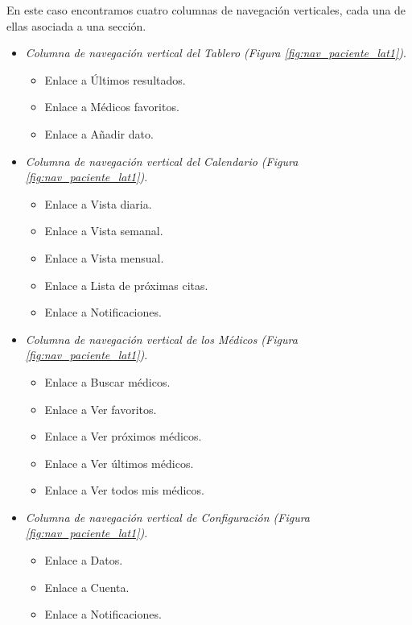 		
		En este caso encontramos cuatro columnas de navegación verticales, cada una de ellas asociada a una sección.
		\begin{itemize}
			\item \textit{Columna de navegación vertical del Tablero (Figura \ref{fig:nav_paciente_lat1})}. 
				\begin{itemize}
					\item Enlace a Últimos resultados.
					\item Enlace a Médicos favoritos.
					\item Enlace a Añadir dato.
				\end{itemize}
			\item \textit{Columna de navegación vertical del Calendario (Figura \ref{fig:nav_paciente_lat1})}.
				\begin{itemize}
					\item Enlace a Vista diaria.
					\item Enlace a Vista semanal.
					\item Enlace a Vista mensual.
					\item Enlace a Lista de próximas citas.
					\item Enlace a Notificaciones.
				\end{itemize}
			\item \textit{Columna de navegación vertical de los Médicos (Figura \ref{fig:nav_paciente_lat1})}.
				\begin{itemize}
					\item Enlace a Buscar médicos.
					\item Enlace a Ver favoritos.
					\item Enlace a Ver próximos médicos.
					\item Enlace a Ver últimos médicos.
					\item Enlace a Ver todos mis médicos.
				\end{itemize}
			\item \textit{Columna de navegación vertical de Configuración (Figura \ref{fig:nav_paciente_lat1})}.
				\begin{itemize}
					\item Enlace a Datos.
					\item Enlace a Cuenta.
					\item Enlace a Notificaciones.
				\end{itemize}
		\end{itemize}
		
